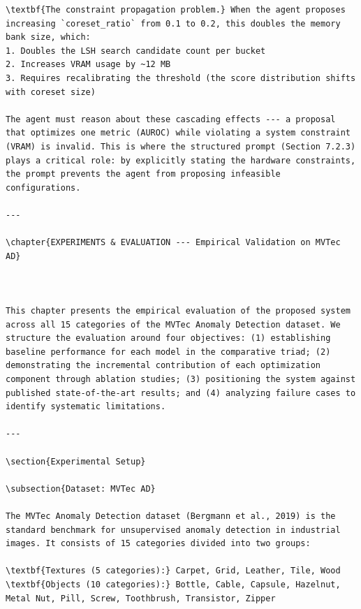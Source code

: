 \documentclass[12pt,a4paper,oneside]{report}
\begin{document}
\begin{verbatim}
\textbf{The constraint propagation problem.} When the agent proposes increasing `coreset_ratio` from 0.1 to 0.2, this doubles the memory bank size, which:
1. Doubles the LSH search candidate count per bucket
2. Increases VRAM usage by ~12 MB
3. Requires recalibrating the threshold (the score distribution shifts with coreset size)

The agent must reason about these cascading effects --- a proposal that optimizes one metric (AUROC) while violating a system constraint (VRAM) is invalid. This is where the structured prompt (Section 7.2.3) plays a critical role: by explicitly stating the hardware constraints, the prompt prevents the agent from proposing infeasible configurations.

---

\chapter{EXPERIMENTS & EVALUATION --- Empirical Validation on MVTec AD}



This chapter presents the empirical evaluation of the proposed system across all 15 categories of the MVTec Anomaly Detection dataset. We structure the evaluation around four objectives: (1) establishing baseline performance for each model in the comparative triad; (2) demonstrating the incremental contribution of each optimization component through ablation studies; (3) positioning the system against published state-of-the-art results; and (4) analyzing failure cases to identify systematic limitations.

---

\section{Experimental Setup}

\subsection{Dataset: MVTec AD}

The MVTec Anomaly Detection dataset (Bergmann et al., 2019) is the standard benchmark for unsupervised anomaly detection in industrial images. It consists of 15 categories divided into two groups:

\textbf{Textures (5 categories):} Carpet, Grid, Leather, Tile, Wood
\textbf{Objects (10 categories):} Bottle, Cable, Capsule, Hazelnut, Metal Nut, Pill, Screw, Toothbrush, Transistor, Zipper


\end{verbatim}
\end{document}
